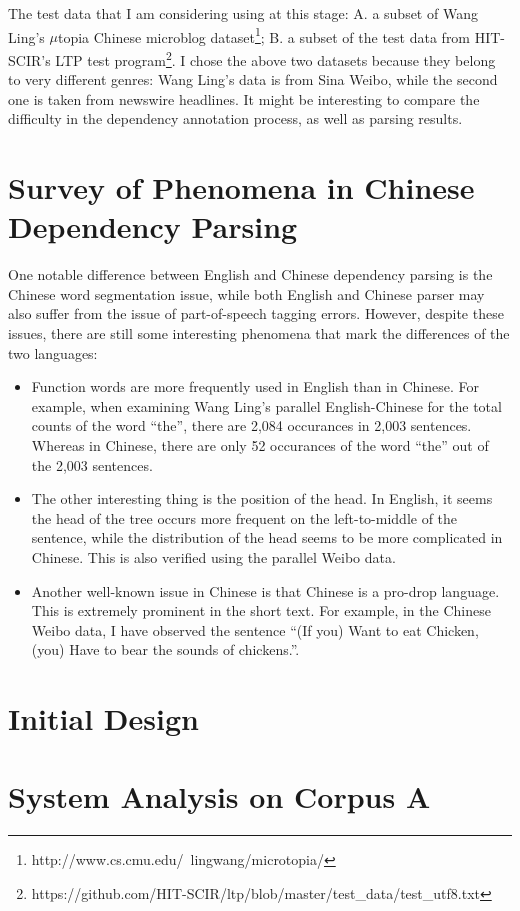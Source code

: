 \documentclass[11pt,letterpaper]{article}
\begin{document}
The test data that I am considering using at this stage: A. a subset of Wang Ling's $\mu$topia Chinese microblog dataset\footnote{http://www.cs.cmu.edu/~lingwang/microtopia/}; B. a subset of the test data from HIT-SCIR's LTP test program\footnote{https://github.com/HIT-SCIR/ltp/blob/master/test\_data/test\_utf8.txt}.
I chose the above two datasets because they belong to very different genres:
Wang Ling's data is from Sina Weibo, while the second one is taken from newswire headlines.
It might be interesting to compare the difficulty in the dependency annotation process,
as well as parsing results.

\section{Survey of Phenomena in Chinese Dependency Parsing}
One notable difference between English and Chinese dependency parsing is the Chinese word segmentation issue,
while both English and Chinese parser may also suffer from the issue of part-of-speech tagging errors.
However, despite these issues, there are still some interesting phenomena that mark the differences of the two languages:
\begin{itemize}
\item Function words are more frequently used in English than in Chinese.
For example, when examining Wang Ling's parallel English-Chinese for the total counts of the word ``the'',
there are 2,084 occurances in 2,003 sentences. Whereas in Chinese, there are only 52 occurances of the word 	``the'' 
out of the 2,003 sentences.
\item The other interesting thing is the position of the head. In English, it seems the head of the tree occurs more frequent
on the left-to-middle of the sentence, while the distribution of the head seems to be more complicated in Chinese.
This is also verified using the parallel Weibo data.
\item Another well-known issue in Chinese is that Chinese is a pro-drop language. 
This is extremely prominent in the short text. For example, in the Chinese Weibo data,
I have observed the sentence ``(If you) Want to eat Chicken, (you) Have to  bear the sounds of chickens.''.
\end{itemize}

\section{Initial Design}

\section{System Analysis on Corpus A}
\end{document}
